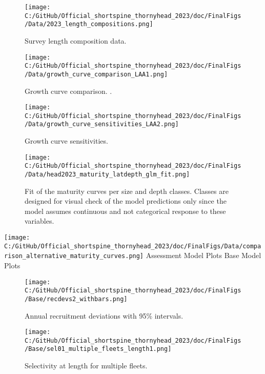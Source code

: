 \documentclass[11pt,
  english,
  letterpaper,
]{article}
\begin{document}
\begin{figure}
\centering
\texttt{[image: C:/GitHub/Official\_shortspine\_thornyhead\_2023/doc/FinalFigs/Data/2023\_length\_compositions.png]}
\caption{Survey length composition data.\label{fig:survey_comps}}
\end{figure}

\begin{figure}
\centering
\texttt{[image: C:/GitHub/Official\_shortspine\_thornyhead\_2023/doc/FinalFigs/Data/growth\_curve\_comparison\_LAA1.png]}
\caption{Growth curve comparison. .\label{fig:growth_LAA1}}
\end{figure}

\begin{figure}
\centering
\texttt{[image: C:/GitHub/Official\_shortspine\_thornyhead\_2023/doc/FinalFigs/Data/growth\_curve\_sensitivities\_LAA2.png]}
\caption{Growth curve sensitivities.\label{fig:growth_LAA2}}
\end{figure}

\begin{figure}
\centering
\texttt{[image: C:/GitHub/Official\_shortspine\_thornyhead\_2023/doc/FinalFigs/Data/head2023\_maturity\_latdepth\_glm\_fit.png]}
\caption{Fit of the maturity curves per size and depth classes. Classes are designed for visual check of the model predictions only since the model assumes continuous and not categorical response to these variables.\label{fig:mat1}}
\end{figure}

\texttt{[image: C:/GitHub/Official\_shortspine\_thornyhead\_2023/doc/FinalFigs/Data/comparison\_alternative\_maturity\_curves.png]} Assessment Model Plots Base Model Plots

\begin{figure}
\centering
\texttt{[image: C:/GitHub/Official\_shortspine\_thornyhead\_2023/doc/FinalFigs/Base/recdevs2\_withbars.png]}
\caption{Annual recruitment deviations with 95\% intervals.\label{fig:recdevs}}
\end{figure}

\begin{figure}
\centering
\texttt{[image: C:/GitHub/Official\_shortspine\_thornyhead\_2023/doc/FinalFigs/Base/sel01\_multiple\_fleets\_length1.png]}
\caption{Selectivity at length for multiple fleets.\label{fig:selcurvs}}
\end{figure}
\end{document}
